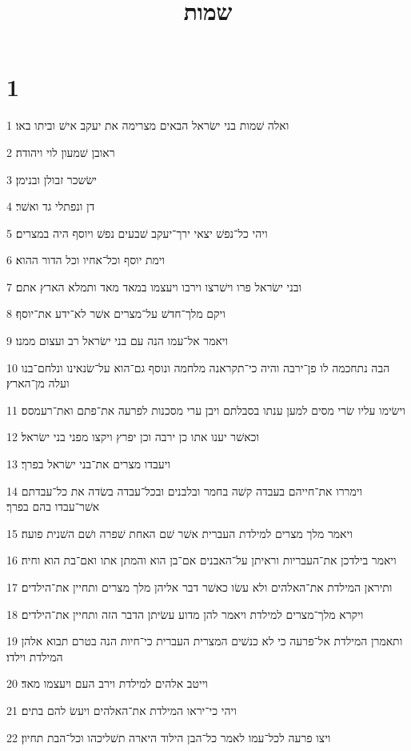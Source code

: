 

\title{שמות}


\chapter{1}

\par 1 ואלה שׁמות בני ישׂראל הבאים מצרימה את יעקב אישׁ וביתו באו׃
\par 2 ראובן שׁמעון לוי ויהודה׃
\par 3 ישׂשכר זבולן ובנימן׃
\par 4 דן ונפתלי גד ואשׁר׃
\par 5 ויהי כל־נפשׁ יצאי ירך־יעקב שׁבעים נפשׁ ויוסף היה במצרים׃
\par 6 וימת יוסף וכל־אחיו וכל הדור ההוא׃
\par 7 ובני ישׂראל פרו וישׁרצו וירבו ויעצמו במאד מאד ותמלא הארץ אתם׃
\par 8 ויקם מלך־חדשׁ על־מצרים אשׁר לא־ידע את־יוסף׃
\par 9 ויאמר אל־עמו הנה עם בני ישׂראל רב ועצום ממנו׃
\par 10 הבה נתחכמה לו פן־ירבה והיה כי־תקראנה מלחמה ונוסף גם־הוא על־שׂנאינו ונלחם־בנו ועלה מן־הארץ׃
\par 11 וישׂימו עליו שׂרי מסים למען ענתו בסבלתם ויבן ערי מסכנות לפרעה את־פתם ואת־רעמסס׃
\par 12 וכאשׁר יענו אתו כן ירבה וכן יפרץ ויקצו מפני בני ישׂראל׃
\par 13 ויעבדו מצרים את־בני ישׂראל בפרך׃
\par 14 וימררו את־חייהם בעבדה קשׁה בחמר ובלבנים ובכל־עבדה בשׂדה את כל־עבדתם אשׁר־עבדו בהם בפרך׃
\par 15 ויאמר מלך מצרים למילדת העברית אשׁר שׁם האחת שׁפרה ושׁם השׁנית פועה׃
\par 16 ויאמר בילדכן את־העבריות וראיתן על־האבנים אם־בן הוא והמתן אתו ואם־בת הוא וחיה׃
\par 17 ותיראן המילדת את־האלהים ולא עשׂו כאשׁר דבר אליהן מלך מצרים ותחיין את־הילדים׃
\par 18 ויקרא מלך־מצרים למילדת ויאמר להן מדוע עשׂיתן הדבר הזה ותחיין את־הילדים׃
\par 19 ותאמרן המילדת אל־פרעה כי לא כנשׁים המצרית העברית כי־חיות הנה בטרם תבוא אלהן המילדת וילדו׃
\par 20 וייטב אלהים למילדת וירב העם ויעצמו מאד׃
\par 21 ויהי כי־יראו המילדת את־האלהים ויעשׂ להם בתים׃
\par 22 ויצו פרעה לכל־עמו לאמר כל־הבן הילוד היארה תשׁליכהו וכל־הבת תחיון׃

